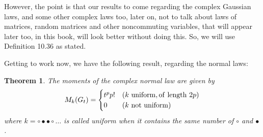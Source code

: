 \documentclass[12pt]{amsbook}
\newtheorem{theorem}{Theorem}[chapter]
\begin{document}
However, the point is that our results to come regarding the complex Gaussian laws, and some other complex laws too, later on, not to talk about laws of matrices, random matrices and other noncommuting variables, that will appear later too, in this book, will look better without doing this. So, we will use Definition 10.36 as stated. 

\bigskip

Getting to work now, we have the following result, regarding the normal laws:

\begin{theorem}
The moments of the complex normal law are given by
$$M_k(G_t)=\begin{cases}
t^pp!&(k\ {\rm uniform, of\ length}\ 2p)\\
0&(k\ {\rm not\ uniform})
\end{cases}$$
where $k=\circ\bullet\bullet\circ\ldots$ is called uniform when it contains the same number of $\circ$ and $\bullet$.
\end{theorem}
\end{document}
